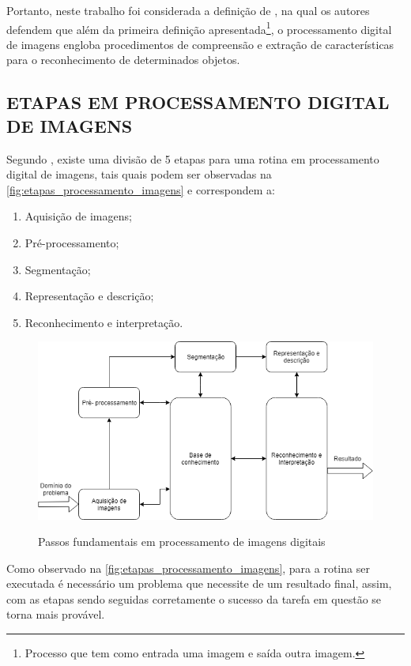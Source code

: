 \par Portanto, neste trabalho foi considerada a definição de , na qual os autores defendem que além da primeira definição apresentada\footnote{Processo que tem como entrada uma imagem e saída outra imagem.}, o processamento digital de imagens engloba procedimentos de compreensão e extração de características para o reconhecimento de determinados objetos.

\subsection{ETAPAS EM PROCESSAMENTO DIGITAL DE IMAGENS}
\label{subsec:etapas}
Segundo , existe uma divisão de 5 etapas para uma rotina em processamento digital de imagens, tais quais podem ser observadas na \autoref{fig:etapas_processamento_imagens} e correspondem a:
\begin{enumerate}
    \item Aquisição de imagens;
    \item Pré-processamento;
    \item Segmentação;
    \item Representação e descrição;
    \item Reconhecimento e interpretação.
\end{enumerate}

\begin{figure}[!h]
    \centering
    \caption{Passos fundamentais em processamento de imagens digitais}
    \includegraphics[width=1\textwidth]{./dados/figuras/etapas_processamento_imagens.png}
    \label{fig:etapas_processamento_imagens}
\end{figure}

\par Como observado na \autoref{fig:etapas_processamento_imagens}, para a rotina ser executada é necessário um problema que necessite de um resultado final, assim, com as etapas sendo seguidas corretamente o sucesso da tarefa em questão se torna mais provável. 

